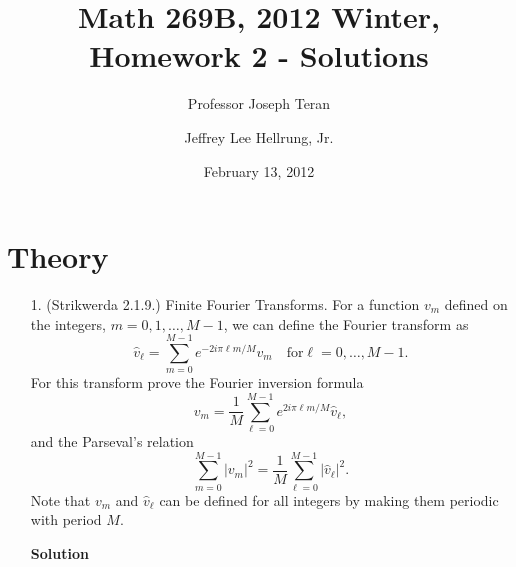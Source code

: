 \documentclass{article}
\providecommand{\abs}[1]{\left\lvert#1\right\rvert}
\begin{document}
\title{Math 269B, 2012 Winter, Homework 2 - Solutions}
\date{February 13, 2012}
\author{Professor Joseph Teran \and Jeffrey Lee Hellrung, Jr.}
\maketitle

\section{Theory}

\begin{itemize}

\item[1.] (Strikwerda 2.1.9.) Finite Fourier Transforms. For a function $v_m$ defined on the integers, $m = 0, 1, \dotsc, M-1$, we can define the Fourier transform as
\begin{equation*}
\hat{v}_{\ell} = \sum_{m=0}^{M-1} e^{-2i\pi\ell m/M} v_m \quad \text{for} \ell = 0, \dotsc, M-1.
\end{equation*}
For this transform prove the Fourier inversion formula
\begin{equation*}
v_m = \frac{1}{M} \sum_{\ell=0}^{M-1} e^{2i\pi\ell m/M} \hat{v}_{\ell},
\end{equation*}
and the Parseval's relation
\begin{equation*}
\sum_{m=0}^{M-1} \abs{v_m}^2 = \frac{1}{M} \sum_{\ell=0}^{M-1} \abs{\hat{v}_{\ell}}^2.
\end{equation*}
Note that $v_m$ and $\hat{v}_{\ell}$ can be defined for all integers by making them periodic with period $M$.

\textbf{Solution}


\end{itemize}
\end{document}
